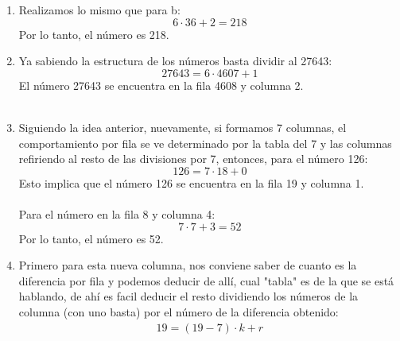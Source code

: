 \documentclass[a4paper]{article}
\begin{document}
\begin{enumerate}
\begin{enumerate}
            Entonces tengo que elegir numeros de la forma $6 \cdot k +4$ con $k>166$, en ese caso elijo 167 y 168 para $k$ y los números serían:
            \begin{gather*}
                6\cdot 167 + 4 = 1006\\
                6\cdot 168 + 4 = 1012
            \end{gather*}
            Nota: todo $k$ de la forma planteada cumple con la condición!
            \item Realizamos lo mismo que para b:
            \begin{equation*}
                6 \cdot 36 +2= 218
            \end{equation*}
            Por lo tanto, el número es 218.
            \item Ya sabiendo la estructura de los números basta dividir al 27643:
            \begin{equation*}
                27643 = 6\cdot 4607 + 1
            \end{equation*}
            El número 27643 se encuentra en la fila 4608 y columna 2.\\\\
            \item Siguiendo la idea anterior, nuevamente, si formamos 7 columnas, el comportamiento por fila se ve determinado por la tabla del 7 y las columnas refiriendo al resto de las divisiones por 7, entonces, para el número 126:
            \begin{equation*}
                126 = 7\cdot 18 + 0
            \end{equation*}
            Esto implica que el número 126 se encuentra en la fila 19 y columna 1.\\\\
             Para el número  en la fila 8 y columna 4:
            \begin{equation*}
                7\cdot 7 + 3 = 52
            \end{equation*}
            Por lo tanto, el número es 52.
            \item Primero para esta nueva columna, nos conviene saber de cuanto es la diferencia por fila y podemos deducir de allí, cual "tabla" es de la que se está hablando, de ahí es facil deducir el resto dividiendo los números de la columna (con uno basta) por el número de la diferencia obtenido:
            \begin{gather*}
                19=(19-7)\cdot k + r\\

\end{gather*}
\end{enumerate}
\end{enumerate}
\end{document}

